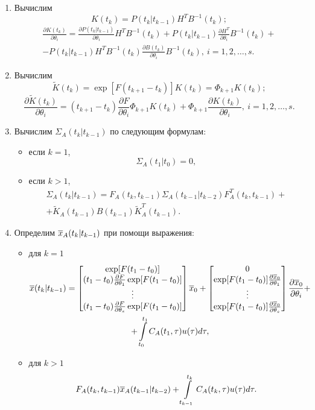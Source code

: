 \documentclass[a4paper,14pt]{extarticle}
\newcommand{\pd}[2]{\frac{\partial #1}{\partial #2}}
\newcommand{\inv}[1]{#1^{-1}}
\begin{document}
\begin{enumerate}
\item Вычислим
\[
	K(t_k) = P(t_k|t_{k-1}) H^T \inv{B}(t_k);
\]
\begin{multline*}
	\pd{K(t_k)}{\theta_i} = \pd{P(t_k|t_{k-1})}{\theta_i} H^T \inv{B}(t_k) +
		P(t_k|t_{k-1}) \pd{H^T}{\theta_i} \inv{B}(t_k) + \\ - P(t_k|t_{k-1}) H^T
		\inv{B}(t_k) \pd{B(t_k)}{\theta_i} \inv{B}(t_k),\ i = 1, 2, \ldots, s.
\end{multline*}

\item Вычислим
\[
	\tilde{K}(t_k) = \exp \left[ F(t_{k+1} - t_k) \right] K(t_k) = \Phi_{k+1}
		K(t_k);
\]
\[
	\pd{\tilde{K}(t_k)}{\theta_i} = (t_{k+1} - t_k) \pd{F}{\theta_i} \Phi_{k+1}
		K(t_k) + \Phi_{k+1} \pd{K(t_k)}{\theta_i},\ i = 1, 2, \ldots, s.
\]

\item Вычислим $\Sigma_A(t_k|t_{k-1})$ по следующим формулам:
	\begin{itemize}
		\item если $k = 1$,
			\[
				\Sigma_A(t_1|t_0) = 0,
			\]
		\item если $k > 1$,
			\begin{multline*}
				\Sigma_A(t_k|t_{k-1}) = F_A(t_k, t_{k-1}) \Sigma_A(t_{k-1}|t_{k-2})
					F_A^T(t_k, t_{k-1}) + \\ + \tilde{K}_A(t_{k-1}) B(t_{k-1})
					\tilde{K}_A^T(t_{k-1}).
			\end{multline*}
	\end{itemize}

\item Определим $\overline{x}_A(t_k|t_{k-1})$ при помощи выражения:
	\begin{itemize}
		\item для $k = 1$
			\begin{multline*}
				\ol{x}(t_k|t_{k-1}) =
				\begin{bmatrix}
					\exp[ F(t_1 - t_0) ] \\
					(t_1 - t_0) \pd{F}{\theta_1} \exp[ F(t_1 - t_0) ] \\
					\vdots \\
					(t_1 - t_0) \pd{F}{\theta_s} \exp[ F(t_1 - t_0) ] \\
				\end{bmatrix}
				\ol{x}_0 +
					\begin{bmatrix}
						0 \\
						\exp [ F(t_1 - t_0) ] \pd{\ol{x}_0}{\theta_1} \\
						\vdots \\
						\exp [ F(t_1 - t_0) ] \pd{\ol{x}_0}{\theta_s} \\
					\end{bmatrix}
					\pd{\ol{x}_0}{\theta_i} + \\ +
					\int\limits_{t_0}^{t_1} C_A(t_1, \tau) u(\tau) d\tau,
				\end{multline*}
		\item для $k > 1$
			\[
				F_A (t_k, t_{k-1}) \overline{x}_A(t_{k-1}|t_{k-2}) + 
					\int\limits_{t_{k-1}}^{t_k} C_A(t_k, \tau) u(\tau) d\tau.
			\]
	\end{itemize}


\end{enumerate}
\end{document}
